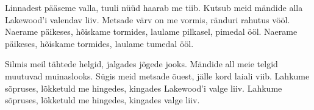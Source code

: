Linnadest p\"a\"aseme valla,
tuuli n\"u\"ud haarab me tiib.
Kutsub meid m\"andide alla
Lakewood'i valendav liiv.
Metsade v\"arv on me vormis,
r\"anduri rahutus v\"o\"ol.
Naerame p\"aikeses, h\~oiskame tormides,
laulame pilkasel, pimedal \"o\"ol.
Naerame p\"aikeses, h\~oiskame tormides,
laulame tumedal \"o\"ol.

Silmis meil t\"ahtede helgid,
jalgades j\~ogede jooks.
M\"andide all meie telgid
muutuvad muinaslooks.
S\"ugis meid metsade \~ouest,
j\"alle kord laiali viib.
Lahkume s\~opruses, l\~okketuld me hingedes,
kingades Lakewood'i valge liiv. 
Lahkume s\~opruses, l\~okketuld me hingedes,
kingades valge liiv. 